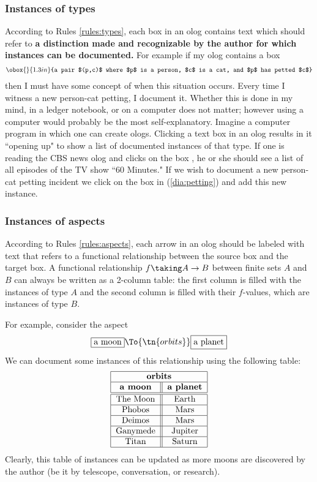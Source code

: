 \subsubsection{Instances of types}\label{sec:instances of types}

According to Rules \ref{rules:types}, each box in an olog contains text which should refer to {\bf a distinction made and recognizable by the author for which instances can be documented.}  For example if my olog contains a box \begin{align}\label{dia:petting}\obox{}{1.3in}{a pair $(p,c)$ where $p$ is a person, $c$ is a cat, and $p$ has petted $c$}\end{align} then I must have some concept of when this situation occurs. Every time I witness a new person-cat petting, I document it. Whether this is done in my mind, in a ledger notebook, or on a computer does not matter; however using a computer would probably be the most self-explanatory. Imagine a computer program in which one can create ologs. Clicking a text box in an olog results in it ``opening up" to show a list of documented instances of that type. If one is reading the CBS news olog and clicks on the box , he or she should see a list of all episodes of the TV show ``60 Minutes." If we wish to document a new person-cat petting incident we click on the box in (\ref{dia:petting}) and add this new instance.

\subsubsection{Instances of aspects}

According to Rules \ref{rules:aspects}, each arrow in an olog should be labeled with text that refers to a functional relationship between the source box and the target box. A functional relationship $f\taking A\to B$ between finite sets $A$ and $B$ can always be written as a 2-column table: the first column is filled with the instances of type $A$ and the second column is filled with their $f$-values, which are instances of type $B$. 

For example, consider the aspect \begin{align}\label{dia:moon1}\fbox{a moon}\To{\tn{orbits}}\fbox{a planet}\end{align}  We can document some instances of this relationship using the following table: \begin{align}\label{dia:moon2}\begin{tabular}{| c || c |}\hline\multicolumn{2}{| c |}{\bf orbits}\\\hline{\bf a moon}&{\bf a planet}\\\hline\hline The Moon&Earth\\\hline Phobos&Mars\\\hline Deimos&Mars\\\hline Ganymede & Jupiter\\\hline Titan & Saturn\\\hline\end{tabular}\end{align}  Clearly, this table of instances can be updated as more moons are discovered by the author (be it by telescope, conversation, or research).

